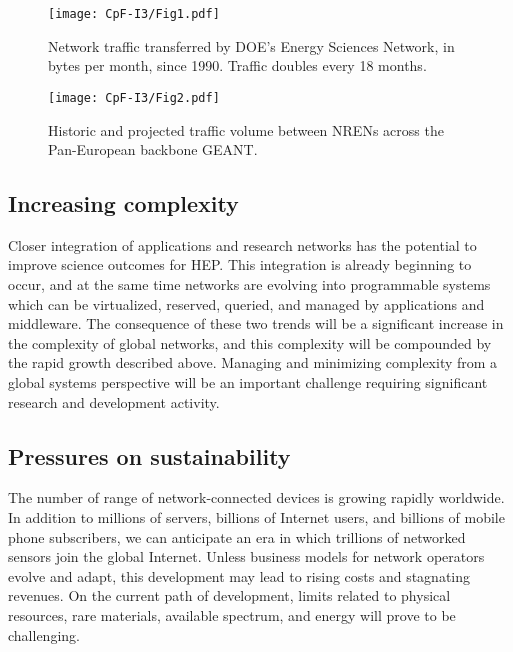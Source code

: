 \begin{figure}[htb]
\begin{center}
\texttt{[image: CpF-I3/Fig1.pdf]}
\caption{Network traffic transferred by DOE’s Energy Sciences Network, in bytes per month, since 1990.  Traffic doubles every 18 months.}
\label{fig:Fig1}
\end{center}
\end{figure}


\begin{figure}[htb]
\begin{center}
\texttt{[image: CpF-I3/Fig2.pdf]}
\caption{Historic and projected traffic volume between NRENs across the Pan-European backbone GEANT.}
\label{fig:Fig2}
\end{center}
\end{figure}



\subsection{Increasing complexity}

Closer integration of applications and research networks has the potential to improve science outcomes for HEP. This integration is already beginning to occur, and at the same time networks are evolving into programmable systems which can be virtualized, reserved, queried, and managed by applications and middleware. The consequence of these two trends will be a significant increase in the complexity of global networks, and this complexity will be compounded by the rapid growth described above. Managing and minimizing complexity from a global systems perspective will be an important challenge requiring significant research and development activity.  

\subsection{Pressures on sustainability}

The number of range of network-connected devices is growing rapidly worldwide. In addition to millions of servers, billions of Internet users, and billions of mobile phone subscribers, we can anticipate an era in which trillions of networked sensors join the global Internet. Unless business models for network operators evolve and adapt, this development may lead to rising costs and stagnating revenues. On the current path of development, limits related to physical resources, rare materials, available spectrum, and energy will prove to be challenging.   

